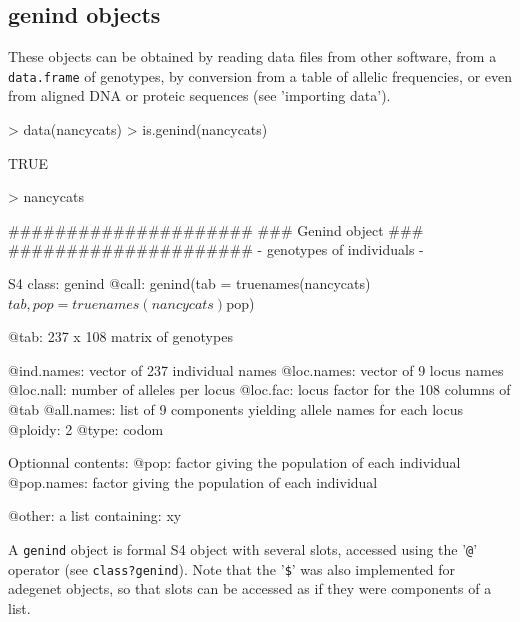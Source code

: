 \documentclass{article}
\begin{document}
\subsection{genind objects}
These objects can be obtained by reading data files from other software,
from a \texttt{data.frame} of genotypes, by conversion from a table of
allelic frequencies, or even from aligned DNA or proteic sequences (see 'importing data').
\begin{Schunk}
\begin{Sinput}
> data(nancycats)
> is.genind(nancycats)
\end{Sinput}
\begin{Soutput}
[1] TRUE
\end{Soutput}
\begin{Sinput}
> nancycats
\end{Sinput}
\begin{Soutput}
   #####################
   ### Genind object ### 
   #####################
- genotypes of individuals - 

S4 class:  genind
@call: genind(tab = truenames(nancycats)$tab, pop = truenames(nancycats)$pop)

@tab:  237 x 108 matrix of genotypes

@ind.names: vector of  237 individual names
@loc.names: vector of  9 locus names
@loc.nall: number of alleles per locus
@loc.fac: locus factor for the  108 columns of @tab
@all.names: list of  9 components yielding allele names for each locus
@ploidy:  2
@type:  codom

Optionnal contents: 
@pop:  factor giving the population of each individual
@pop.names:  factor giving the population of each individual

@other: a list containing: xy 
\end{Soutput}
\end{Schunk}
A \texttt{genind} object is formal S4 object with several slots,
accessed using the '\texttt{@}' operator (see \texttt{class?genind}).
Note that the '\texttt{\$}' was also implemented for adegenet objects,
so that slots can be accessed as if they were components of a list.
\\
\end{document}

